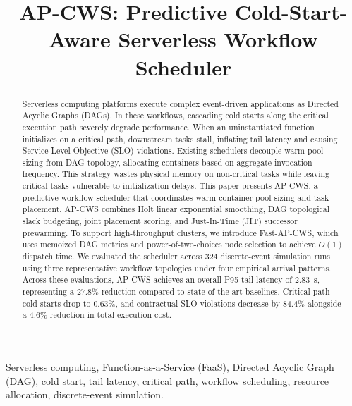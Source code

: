 \documentclass[conference]{IEEEtran}
\begin{document}
\title{\LARGE\bfseries AP-CWS: Predictive Cold-Start-Aware Serverless Workflow Scheduler}

\author{
}

\maketitle

\begin{abstract}
Serverless computing platforms execute complex event-driven applications as Directed Acyclic Graphs (DAGs). In these workflows, cascading cold starts along the critical execution path severely degrade performance. When an uninstantiated function initializes on a critical path, downstream tasks stall, inflating tail latency and causing Service-Level Objective (SLO) violations. Existing schedulers decouple warm pool sizing from DAG topology, allocating containers based on aggregate invocation frequency. This strategy wastes physical memory on non-critical tasks while leaving critical tasks vulnerable to initialization delays. This paper presents AP-CWS, a predictive workflow scheduler that coordinates warm container pool sizing and task placement. AP-CWS combines Holt linear exponential smoothing, DAG topological slack budgeting, joint placement scoring, and Just-In-Time (JIT) successor prewarming. To support high-throughput clusters, we introduce Fast-AP-CWS, which uses memoized DAG metrics and power-of-two-choices node selection to achieve $O(1)$ dispatch time. We evaluated the scheduler across 324 discrete-event simulation runs using three representative workflow topologies under four empirical arrival patterns. Across these evaluations, AP-CWS achieves an overall P95 tail latency of 2.83~s, representing a 27.8\% reduction compared to state-of-the-art baselines. Critical-path cold starts drop to 0.63\%, and contractual SLO violations decrease by 84.4\% alongside a 4.6\% reduction in total execution cost.
\end{abstract}

\begin{IEEEkeywords}
Serverless computing, Function-as-a-Service (FaaS), Directed Acyclic Graph (DAG), cold start, tail latency, critical path, workflow scheduling, resource allocation, discrete-event simulation.
\end{IEEEkeywords}
\end{document}
